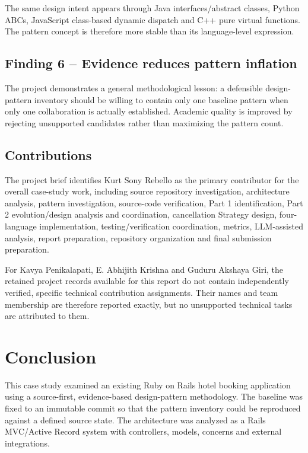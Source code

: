 \documentclass[10pt,a4paper]{article}
\begin{document}
The same design intent appears through Java interfaces/abstract classes, Python ABCs, JavaScript class-based dynamic dispatch and C++ pure virtual functions. The pattern concept is therefore more stable than its language-level expression.

\subsection{Finding 6 -- Evidence reduces pattern inflation}

The project demonstrates a general methodological lesson: a defensible design-pattern inventory should be willing to contain only one baseline pattern when only one collaboration is actually established. Academic quality is improved by rejecting unsupported candidates rather than maximizing the pattern count.

\subsection{Contributions}

The project brief identifies Kurt Sony Rebello as the primary contributor for the overall case-study work, including source repository investigation, architecture analysis, pattern investigation, source-code verification, Part 1 identification, Part 2 evolution/design analysis and coordination, cancellation Strategy design, four-language implementation, testing/verification coordination, metrics, LLM-assisted analysis, report preparation, repository organization and final submission preparation.

For Kavya Penikalapati, E. Abhijith Krishna and Guduru Akshaya Giri, the retained project records available for this report do not contain independently verified, specific technical contribution assignments. Their names and team membership are therefore reported exactly, but no unsupported technical tasks are attributed to them.

\section{Conclusion}

This case study examined an existing Ruby on Rails hotel booking application using a source-first, evidence-based design-pattern methodology. The baseline was fixed to an immutable commit so that the pattern inventory could be reproduced against a defined source state. The architecture was analyzed as a Rails MVC/Active Record system with controllers, models, concerns and external integrations.
\end{document}
